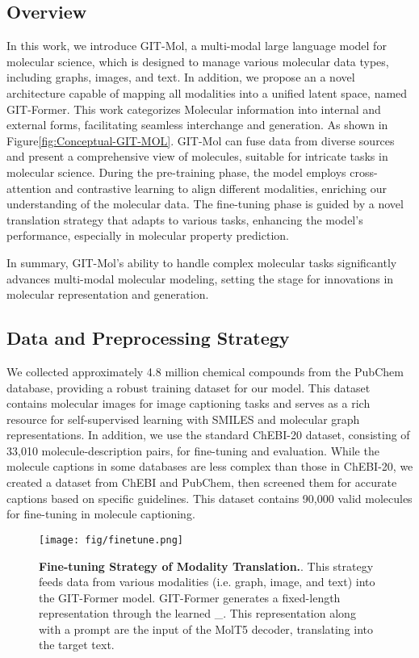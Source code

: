 \documentclass{article}
\begin{document}
\subsection{Overview}
In this work, we introduce GIT-Mol, a multi-modal large language model for molecular science, which is designed to manage various molecular data types, including graphs, images, and text. In addition, we propose an a novel architecture capable of mapping all modalities into a unified latent space, named GIT-Former. This work categorizes Molecular information into internal and external forms, facilitating seamless interchange and generation. As shown in Figure\ref{fig:Conceptual-GIT-MOL}. GIT-Mol can fuse data from diverse sources and present a comprehensive view of molecules, suitable for intricate tasks in molecular science. During the pre-training phase, the model employs cross-attention and contrastive learning to align different modalities, enriching our understanding of the molecular data. The fine-tuning phase is guided by a novel translation strategy that adapts to various tasks, enhancing the model's performance, especially in molecular property prediction.

In summary, GIT-Mol's ability to handle complex molecular tasks significantly advances multi-modal molecular modeling, setting the stage for innovations in molecular representation and generation.

\subsection{Data and Preprocessing Strategy}


We collected approximately 4.8 million chemical compounds from the PubChem\cite{kim2019pubchem} database, providing a robust training dataset for our model. This dataset contains molecular images for image captioning tasks and serves as a rich resource for self-supervised learning with SMILES and molecular graph representations.
In addition, we use the standard ChEBI-20 dataset\cite{edwards2021text2mol}, consisting of 33,010 molecule-description pairs, for fine-tuning and evaluation. While the molecule captions in some databases are less complex than those in ChEBI-20, we created a dataset from ChEBI\cite{hastings2016chebi} and PubChem, then screened them for accurate captions based on specific guidelines. This dataset contains 90,000 valid molecules for fine-tuning in molecule captioning.

\begin{figure*}[t!]
\centering
\texttt{[image: fig/finetune.png]}
\caption{\textbf{Fine-tuning Strategy of Modality Translation.}. This strategy feeds data from various modalities (i.e. graph, image, and text) into the GIT-Former model. GIT-Former generates a fixed-length representation through the learned \_. This representation along with a prompt are the input of the MolT5 decoder, translating into the target text.}
\label{fig: finetune Strategy}
\end{figure*}
\end{document}
